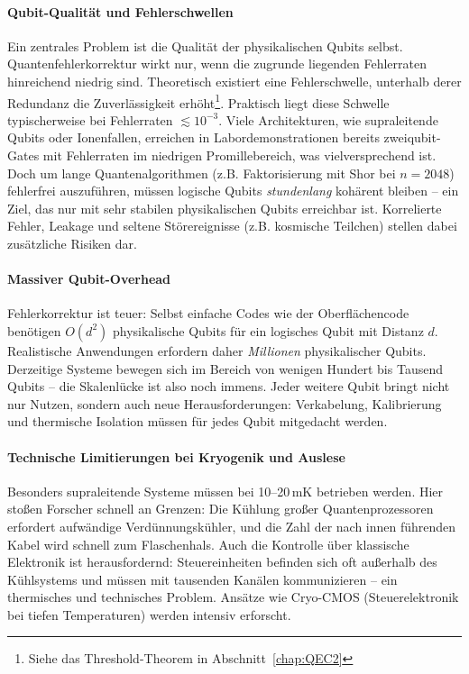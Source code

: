\paragraph{Qubit-Qualit\"at und Fehlerschwellen} 
Ein zentrales Problem ist die Qualit\"at der physikalischen Qubits selbst. Quantenfehlerkorrektur wirkt nur, wenn die zugrunde liegenden Fehlerraten hinreichend niedrig sind. Theoretisch existiert eine Fehlerschwelle, unterhalb derer Redundanz die Zuverl\"assigkeit erh\"oht\footnote{Siehe das Threshold-Theorem in Abschnitt~\ref{chap:QEC2}}. Praktisch liegt diese Schwelle typischerweise bei Fehlerraten $\lesssim 10^{-3}$. Viele Architekturen, wie supraleitende Qubits oder Ionenfallen, erreichen in Labordemonstrationen bereits zweiqubit-Gates mit Fehlerraten im niedrigen Promillebereich, was vielversprechend ist. Doch um lange Quantenalgorithmen (z.B. Faktorisierung mit Shor bei $n=2048$) fehlerfrei auszuf\"uhren, m\"ussen logische Qubits \emph{stundenlang} koh\"arent bleiben -- ein Ziel, das nur mit sehr stabilen physikalischen Qubits erreichbar ist. Korrelierte Fehler, Leakage und seltene St\"orereignisse (z.B. kosmische Teilchen) stellen dabei zus\"atzliche Risiken dar.

\paragraph{Massiver Qubit-Overhead}
Fehlerkorrektur ist teuer: Selbst einfache Codes wie der Oberfl\"achencode ben\"otigen $O(d^2)$ physikalische Qubits f\"ur ein logisches Qubit mit Distanz $d$. Realistische Anwendungen erfordern daher \emph{Millionen} physikalischer Qubits. Derzeitige Systeme bewegen sich im Bereich von wenigen Hundert bis Tausend Qubits -- die Skalenl\"ucke ist also noch immens. Jeder weitere Qubit bringt nicht nur Nutzen, sondern auch neue Herausforderungen: Verkabelung, Kalibrierung und thermische Isolation m\"ussen f\"ur jedes Qubit mitgedacht werden.

\paragraph{Technische Limitierungen bei Kryogenik und Auslese}
Besonders supraleitende Systeme m\"ussen bei 10--20\,mK betrieben werden. Hier stoßen Forscher schnell an Grenzen: Die K\"uhlung gro\ss er Quantenprozessoren erfordert aufw\"andige Verd\"unnungsk\"uhler, und die Zahl der nach innen f\"uhrenden Kabel wird schnell zum Flaschenhals. Auch die Kontrolle \"uber klassische Elektronik ist herausfordernd: Steuereinheiten befinden sich oft au\ss erhalb des K\"uhlsystems und m\"ussen mit tausenden Kan\"alen kommunizieren -- ein thermisches und technisches Problem. Ans\"atze wie Cryo-CMOS (Steuerelektronik bei tiefen Temperaturen) werden intensiv erforscht.

